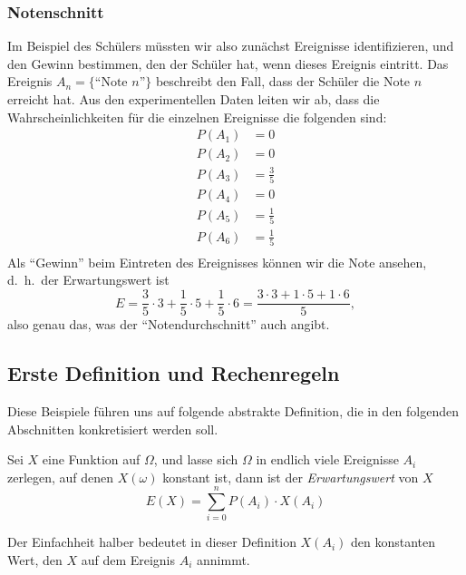\subsubsection{Notenschnitt}
Im Beispiel des Schülers müssten wir also zunächst Ereignisse
identifizieren, und den Gewinn bestimmen, den der Schüler hat, wenn
dieses Ereignis eintritt.
Das Ereignis $A_n=\{\text{``Note $n$''}\}$
beschreibt den Fall, dass der Schüler die Note $n$ erreicht hat.
Aus den experimentellen Daten leiten wir ab, dass die Wahrscheinlichkeiten
für die einzelnen Ereignisse die folgenden sind:
\begin{align*}
P(A_1)&=0\\
P(A_2)&=0\\
P(A_3)&=\frac35\\
P(A_4)&=0\\
P(A_5)&=\frac15\\
P(A_6)&=\frac15\\
\end{align*}
Als
``Gewinn'' beim Eintreten des Ereignisses können wir die Note
ansehen, d.~h.~der Erwartungswert ist 
\[
E=\frac35\cdot 3 + \frac15\cdot 5 + \frac15\cdot 6=\frac{3\cdot 3+ 1\cdot5 + 1\cdot6}{5},
\]
also genau das, was der ``Notendurchschnitt'' auch angibt.

\subsection{Erste Definition und Rechenregeln}
Diese Beispiele führen uns auf folgende abstrakte Definition,
die in den folgenden Abschnitten konkretisiert werden soll.

\begin{definition}
Sei $X$ eine Funktion auf $\Omega$, und lasse sich $\Omega$ in endlich
viele Ereignisse $A_i$ zerlegen, auf denen $X(\omega)$ konstant ist,
dann ist der {\em Erwartungswert} von $X$
\[
E(X)=\sum_{i=0}^nP(A_i)\cdot X(A_i)
\]
\end{definition}

Der Einfachheit halber bedeutet in dieser Definition $X(A_i)$ den
konstanten Wert, den $X$ auf dem Ereignis $A_i$ annimmt.


